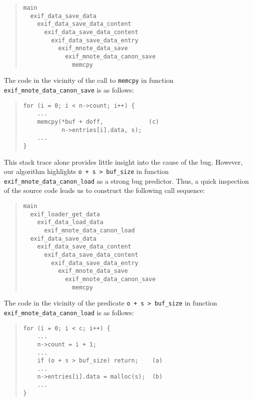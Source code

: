 \begin{quote}
  \small
  \begin{minipage}{\linewidth}
\begin{verbatim}
main
  exif_data_save_data
    exif_data_save_data_content
      exif_data_save_data_content
        exif_data_save_data_entry
          exif_mnote_data_save
            exif_mnote_data_canon_save
              memcpy
\end{verbatim}
  \end{minipage}
\end{quote}

The code in the vicinity of the call to \texttt{memcpy} in function
\texttt{exif\_mnote\_data\_canon\_save} is as follows:

\begin{quote}
  \begin{minipage}{\linewidth}
\begin{verbatim}
for (i = 0; i < n->count; i++) {
    ...
    memcpy(*buf + doff,             (c)
           n->entries[i].data, s);
    ...
}
\end{verbatim}
  \end{minipage}
\end{quote}

This stack trace alone provides little insight into the cause of the
bug.  However, our algorithm highlights \texttt{o + s > buf\_size} in
function \texttt{exif\_mnote\_data\_canon\_load} as a strong bug
predictor.  Thus, a quick inspection of the source code leads us to
construct the following call sequence:

\begin{quote}
  \small
  \begin{minipage}{\linewidth}
\begin{verbatim}
main
  exif_loader_get_data
    exif_data_load_data
      exif_mnote_data_canon_load
  exif_data_save_data
    exif_data_save_data_content
      exif_data_save_data_content
        exif_data_save_data_entry
          exif_mnote_data_save
            exif_mnote_data_canon_save
              memcpy
\end{verbatim}
  \end{minipage}
\end{quote}

The code in the vicinity of the predicate \texttt{o + s > buf\_size}
in function \texttt{exif\_mnote\_data\_canon\_load} is as follows:

\begin{quote}
\begin{verbatim}
for (i = 0; i < c; i++) {
    ...
    n->count = i + 1;
    ...
    if (o + s > buf_size) return;    (a)
    ...
    n->entries[i].data = malloc(s);  (b)
    ...
}
\end{verbatim}
\end{quote}

